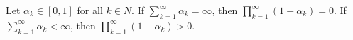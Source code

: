 Let $\alpha_k \in [0, 1]$ for all $k \in N$. If $\sum_{k=1}^{\infty} \alpha_k = \infty$, then $\prod_{k=1}^{\infty} (1 - \alpha_k) = 0$. If $\sum_{k=1}^{\infty} \alpha_k < \infty$, then $\prod_{k=1}^{\infty} (1 - \alpha_k) > 0$.
